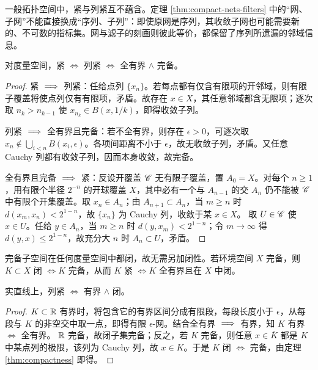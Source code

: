 \begin{remark}
    一般拓扑空间中，紧与列紧互不蕴含。定理 \ref{thm:compact-nets-filters} 中的“网、子网”不能直接换成“序列、子列”：即使原网是序列，其收敛子网也可能需要新的、不可数的指标集。网与滤子的刻画则彼此等价，都保留了序列所遗漏的邻域信息。
\end{remark}

\begin{theorem}\label{thm:compactness}
    对度量空间，紧 $\iff$ 列紧 $\iff$ 全有界 $\land$ 完备。
\end{theorem}
\begin{proof}
    紧 $\implies$ 列紧：任给点列 $\{x_n\}$。若每点都有仅含有限项的开邻域，则有限子覆盖将使点列仅有有限项，矛盾。故存在 $x\in X$，其任意邻域都含无限项；逐次取 $n_k>n_{k-1}$ 使 $x_{n_k}\in B(x,1/k)$，即得收敛子列。

    列紧 $\implies$ 全有界且完备：若不全有界，则存在 $\epsilon>0$，可逐次取 $x_n\notin\bigcup_{i<n}B(x_i,\epsilon)$。各项间距离不小于 $\epsilon$，故无收敛子列，矛盾。又任意 Cauchy 列都有收敛子列，因而本身收敛，故完备。

    全有界且完备 $\implies$ 紧：反设开覆盖 $\mathscr C$ 无有限子覆盖，置 $A_0=X$。对每个 $n\geqslant1$，用有限个半径 $2^{-n}$ 的开球覆盖 $X$，其中必有一个与 $A_{n-1}$ 的交 $A_n$ 仍不能被 $\mathscr C$ 中有限个开集覆盖。取 $x_n\in A_n$；由 $A_{n+1}\subset A_n$，当 $m\geqslant n$ 时 $d(x_m,x_n)<2^{1-n}$，故 $\{x_n\}$ 为 Cauchy 列，收敛于某 $x\in X$。
    取 $U\in\mathscr C$ 使 $x\in U$。任给 $y\in A_n$，当 $m\geqslant n$ 时 $d(y,x_m)<2^{1-n}$；令 $m\to\infty$ 得 $d(y,x)\leqslant2^{1-n}$，故充分大 $n$ 时 $A_n\subset U$，矛盾。
\end{proof}

\begin{remark}
    完备子空间在任何度量空间中都闭，故无需另加闭性。若环境空间 $X$ 完备，则 $K\subset X$ 闭 $\iff K$ 完备，从而 $K$ 紧 $\iff K$ 全有界且在 $X$ 中闭。
\end{remark}

\begin{example}
    实直线上，列紧 $\iff$ 有界 $\land$ 闭。
\end{example}
\begin{proof}
    $K\subset\mathbb{R}$ 有界时，将包含它的有界区间分成有限段，每段长度小于 $\epsilon$，从每段与 $K$ 的非空交中取一点，即得有限 $\epsilon$-网。结合全有界 $\implies$ 有界，知 $K$ 有界 $\iff$ 全有界。
    $\mathbb{R}$ 完备，故闭子集完备；反之，若 $K$ 完备，则任意 $x\in\bar K$ 都是 $K$ 中某点列的极限，该列为 Cauchy 列，故 $x\in K$。于是 $K$ 闭 $\iff$ 完备，由定理 \ref{thm:compactness} 即得。
\end{proof}

